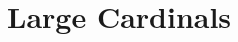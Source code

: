 \documentclass[../main]{subfiles}
\begin{document}
\chapter{Large Cardinals}
\label{apx.large-cardinals}
\thispagestyle{fancy}

\lipsum[1]
\end{document}

